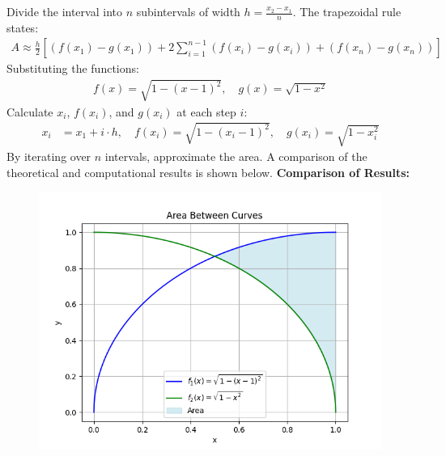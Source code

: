 \documentclass[journal]{IEEEtran}
\begin{document}
Divide the interval into $n$ subintervals of width $h = \frac{x_2 - x_1}{n}$. The trapezoidal rule states:
\begin{align*}
    A \approx \frac{h}{2} \left[ (f(x_1) - g(x_1)) + 2\sum_{i=1}^{n-1} (f(x_i) - g(x_i)) + (f(x_n) - g(x_n)) \right]
\end{align*}
\newline
Substituting the functions:
\begin{align*}
    f(x) = \sqrt{1 - (x - 1)^2}, \quad g(x) = \sqrt{1 - x^2}
\end{align*}
\newline
Calculate $x_i$, $f(x_i)$, and $g(x_i)$ at each step $i$:
\begin{align*}
    x_i &= x_1 + i \cdot h, \quad f(x_i) = \sqrt{1 - (x_i - 1)^2}, \quad g(x_i) = \sqrt{1 - x_i^2}
\end{align*}
\newline
By iterating over $n$ intervals, approximate the area. A comparison of the theoretical and computational results is shown below.
\newline
\textbf{Comparison of Results:}
\begin{figure}[h!]
    \centering
    \includegraphics[width=\columnwidth]{figs/fig.png}
    
\end{figure}
\end{document}
